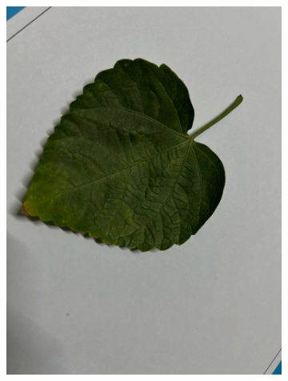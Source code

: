 \documentclass[twocolumn]{article}
\begin{document}
\begin{figure}[H]
\begin{subfigure}[b]{0.30\columnwidth}
        \includegraphics[width=\textwidth]{rosa2}
    \end{subfigure}
    \hfill
    \begin{subfigure}[b]{0.30\columnwidth}

\end{subfigure}
\end{figure}
\end{document}
